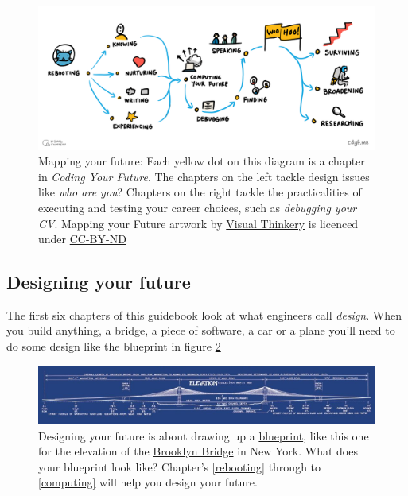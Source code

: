 \documentclass[
]{book}
\begin{document}
\begin{figure}

{\centering \includegraphics[width=1\linewidth]{images/Course Map V3} 

}

\caption{Mapping your future: Each yellow dot on this diagram is a chapter in \emph{Coding Your Future}. The chapters on the left tackle design issues like \emph{who are you}? Chapters on the right tackle the practicalities of executing and testing your career choices, such as \emph{debugging your CV}. Mapping your Future artwork by \href{https://visualthinkery.com/}{Visual Thinkery} is licenced under \href{https://creativecommons.org/licenses/by-nd/4.0/}{CC-BY-ND}}\label{fig:map-fig}
\end{figure}



\hypertarget{parti}{%
\subsection{Designing your future}\label{parti}}

The first six chapters of this guidebook look at what engineers call \emph{design}. When you build anything, a bridge, a piece of software, a car or a plane you'll need to do some design like the blueprint in figure \ref{fig:brooklyn-fig}

\begin{figure}

{\centering \includegraphics[width=1\linewidth]{images/brooklyn-bridge-blueprint} 

}

\caption{Designing your future is about drawing up a \href{https://en.wikipedia.org/wiki/Blueprint}{blueprint}, like this one for the elevation of the \href{https://en.wikipedia.org/wiki/Brooklyn_Bridge}{Brooklyn Bridge} in New York. What does your blueprint look like? Chapter's \ref{rebooting} through to \ref{computing} will help you design your future.}\label{fig:brooklyn-fig}
\end{figure}
\end{document}
